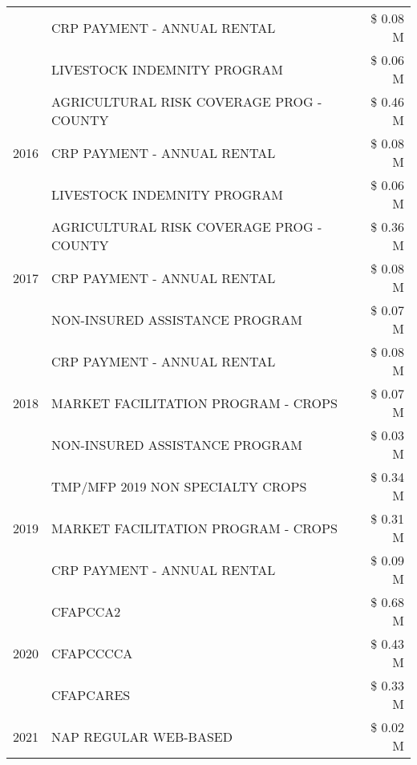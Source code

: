 \begin{tabular}{llr}
 & CRP PAYMENT - ANNUAL RENTAL & \$ 0.08 M \\
 & LIVESTOCK INDEMNITY PROGRAM & \$ 0.06 M \\
\cline{1-3}
\multirow[t]{3}{*}{2016} & AGRICULTURAL RISK COVERAGE PROG - COUNTY & \$ 0.46 M \\
 & CRP PAYMENT - ANNUAL RENTAL & \$ 0.08 M \\
 & LIVESTOCK INDEMNITY PROGRAM & \$ 0.06 M \\
\cline{1-3}
\multirow[t]{3}{*}{2017} & AGRICULTURAL RISK COVERAGE PROG - COUNTY & \$ 0.36 M \\
 & CRP PAYMENT - ANNUAL RENTAL & \$ 0.08 M \\
 & NON-INSURED ASSISTANCE PROGRAM & \$ 0.07 M \\
\cline{1-3}
\multirow[t]{3}{*}{2018} & CRP PAYMENT - ANNUAL RENTAL & \$ 0.08 M \\
 & MARKET FACILITATION PROGRAM - CROPS & \$ 0.07 M \\
 & NON-INSURED ASSISTANCE PROGRAM & \$ 0.03 M \\
\cline{1-3}
\multirow[t]{3}{*}{2019} & TMP/MFP 2019 NON SPECIALTY CROPS & \$ 0.34 M \\
 & MARKET FACILITATION PROGRAM - CROPS & \$ 0.31 M \\
 & CRP PAYMENT - ANNUAL RENTAL & \$ 0.09 M \\
\cline{1-3}
\multirow[t]{3}{*}{2020} & CFAPCCA2 & \$ 0.68 M \\
 & CFAPCCCCA & \$ 0.43 M \\
 & CFAPCARES & \$ 0.33 M \\
\cline{1-3}
2021 & NAP REGULAR WEB-BASED & \$ 0.02 M \\
\cline{1-3}
\bottomrule
\end{tabular}
